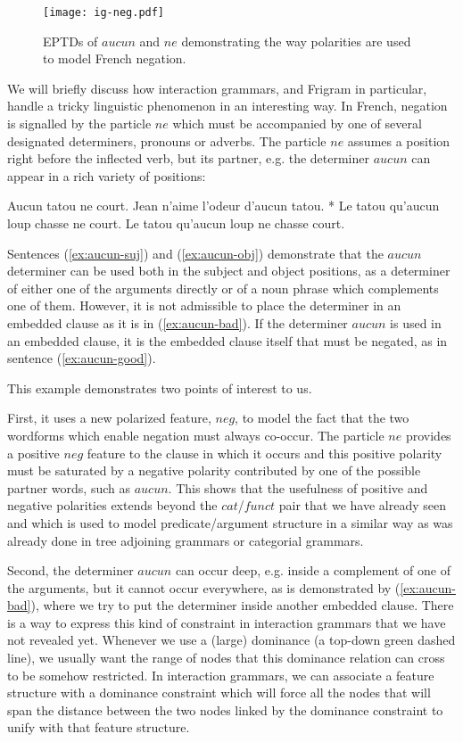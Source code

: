 \begin{figure}
  \centering
  \texttt{[image: ig-neg.pdf]}
  \caption{\label{fig:ig-neg} EPTDs of $aucun$ and $ne$ demonstrating
    the way polarities are used to model French negation.}
\end{figure}

We will briefly discuss how interaction grammars, and Frigram in
particular, handle a tricky linguistic phenomenon in an interesting way.
In French, negation is signalled by the particle $ne$ which must be
accompanied by one of several designated determiners, pronouns or
adverbs. The particle $ne$ assumes a position right before the inflected
verb, but its partner, e.g. the determiner $aucun$ can appear in a rich
variety of positions:

\begin{exe}
  \ex \label{ex:aucun-suj} Aucun tatou ne court.
  \ex \label{ex:aucun-obj} Jean n'aime l'odeur d'aucun tatou.
  \ex \label{ex:aucun-bad} * Le tatou qu'aucun loup chasse ne court.
  \ex \label{ex:aucun-good} Le tatou qu'aucun loup ne chasse court.
\end{exe}

Sentences (\ref{ex:aucun-suj}) and (\ref{ex:aucun-obj}) demonstrate that
the $aucun$ determiner can be used both in the subject and object
positions, as a determiner of either one of the arguments directly or of
a noun phrase which complements one of them. However, it is not
admissible to place the determiner in an embedded clause as it is in
(\ref{ex:aucun-bad}). If the determiner $aucun$ is used in an embedded
clause, it is the embedded clause itself that must be negated, as in
sentence (\ref{ex:aucun-good}).

This example demonstrates two points of interest to us.

First, it uses a new polarized feature, $neg$, to model the fact that
the two wordforms which enable negation must always co-occur. The
particle $ne$ provides a positive $neg$ feature to the clause in which
it occurs and this positive polarity must be saturated by a negative
polarity contributed by one of the possible partner words, such as
$aucun$. This shows that the usefulness of positive and negative
polarities extends beyond the $cat$/$funct$ pair that we have already
seen and which is used to model predicate/argument structure in a
similar way as was already done in tree adjoining grammars or categorial
grammars.

Second, the determiner $aucun$ can occur deep, e.g. inside a complement
of one of the arguments, but it cannot occur everywhere, as is
demonstrated by (\ref{ex:aucun-bad}), where we try to put the determiner
inside another embedded clause. There is a way to express this kind of
constraint in interaction grammars that we have not revealed
yet. Whenever we use a (large) dominance (a top-down green dashed line),
we usually want the range of nodes that this dominance relation can
cross to be somehow restricted. In interaction grammars, we can
associate a feature structure with a dominance constraint which will
force all the nodes that will span the distance between the two nodes
linked by the dominance constraint to unify with that feature
structure.

